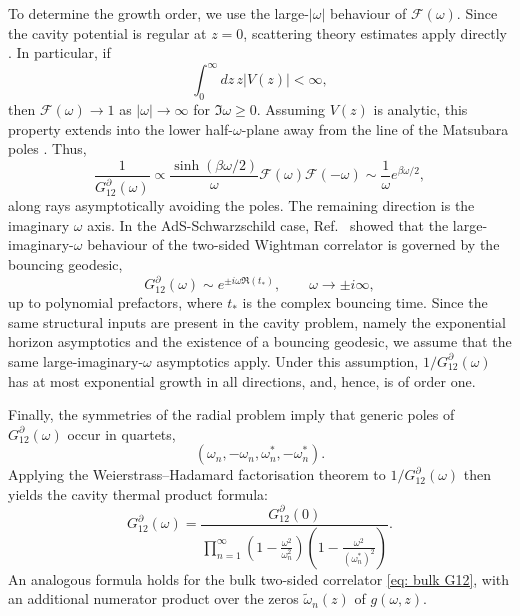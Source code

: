 \documentclass[prd,aps,twocolumn,amsfonts,showpacs,superscriptaddress,preprintnumbers,nofootinbib]{revtex4-2}
\begin{document}
To determine the growth order, we use the large-$|\omega|$ behaviour of $\mathcal F(\omega)$. Since the cavity potential is regular at $z=0$, scattering theory estimates apply directly \cite{Newton:1982qc}. In particular, if
\begin{equation}
\label{eq: cond z}
    \int_0^\infty dz\, z |V(z)| < \infty ,
\end{equation}
then $\mathcal F(\omega)\to 1$ as $|\omega|\to\infty$ for $\Im\omega\geq 0$. Assuming $V(z)$ is analytic, this property extends into the lower half-$\omega$-plane away from the line of the Matsubara poles \cite{Newton:1982qc}. Thus,
\begin{equation}
\label{eq: G12 asymptotics}
    \frac{1}{G_{12}^{\partial}(\omega)}
    \propto
    \frac{\sinh(\beta\omega/2)}{\omega}
    \mathcal F(\omega)\mathcal F(-\omega)
    \sim
    \frac{1}{\omega}e^{\beta\omega/2},
\end{equation}
along rays asymptotically avoiding the poles. The remaining direction is the imaginary $\omega$ axis. In the AdS-Schwarzschild case, Ref.~\cite{festucciathesis} showed that the large-imaginary-$\omega$ behaviour of the two-sided Wightman correlator is governed by the bouncing geodesic,
\begin{equation}
\label{eq: i omega asymptotics}
    G_{12}^{\partial}(\omega)
    \sim e^{\pm i\omega \Re(t_*)},
    \qquad
    \omega\to \pm i\infty ,
\end{equation}
up to polynomial prefactors, where $t_*$ is the complex bouncing time. Since the same structural inputs are present in the cavity problem, namely the exponential horizon asymptotics and the existence of a bouncing geodesic, we assume that the same large-imaginary-$\omega$ asymptotics apply. Under this assumption, $1/G_{12}^{\partial}(\omega)$ has at most exponential growth in all directions, and, hence, is of order one.

Finally, the symmetries of the radial problem imply that generic poles of $G_{12}^{\partial}(\omega)$ occur in quartets,
\begin{equation*}
     (\omega_n,-\omega_n,\omega_n^*,-\omega_n^*) .
\end{equation*}
Applying the Weierstrass--Hadamard factorisation theorem to $1/G_{12}^{\partial}(\omega)$ then yields the cavity thermal product formula:
\begin{equation}
    G_{12}^{\partial}(\omega)
    =
    \frac{G_{12}^{\partial}(0)}
    {\displaystyle\prod_{n=1}^\infty
    \left(1-\frac{\omega^2}{\omega_n^2}\right)
    \left(1-\frac{\omega^2}{(\omega_n^*)^2}\right)} .
\end{equation}
An analogous formula holds for the bulk two-sided correlator \eqref{eq: bulk G12}, with an additional numerator product over the zeros $\tilde{\omega}_n(z)$ of $g(\omega,z)$.
\end{document}

